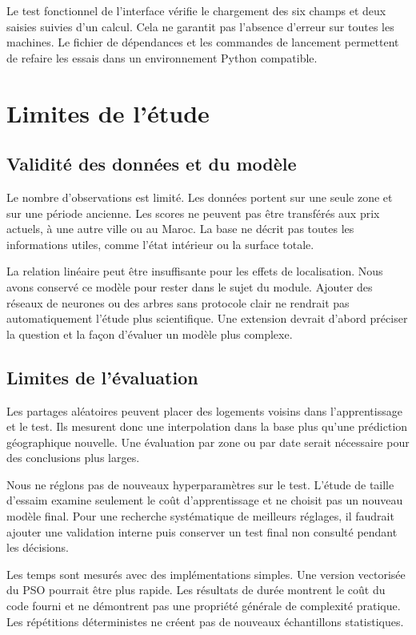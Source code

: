 \documentclass[conference,a4paper]{IEEEtran}
\begin{document}
Le test fonctionnel de l'interface vérifie le chargement des six champs et deux saisies suivies d'un calcul. Cela ne garantit pas l'absence d'erreur sur toutes les machines. Le fichier de dépendances et les commandes de lancement permettent de refaire les essais dans un environnement Python compatible.

\section{Limites de l'étude}
\subsection{Validité des données et du modèle}
Le nombre d'observations est limité. Les données portent sur une seule zone et sur une période ancienne. Les scores ne peuvent pas être transférés aux prix actuels, à une autre ville ou au Maroc. La base ne décrit pas toutes les informations utiles, comme l'état intérieur ou la surface totale.

La relation linéaire peut être insuffisante pour les effets de localisation. Nous avons conservé ce modèle pour rester dans le sujet du module. Ajouter des réseaux de neurones ou des arbres sans protocole clair ne rendrait pas automatiquement l'étude plus scientifique. Une extension devrait d'abord préciser la question et la façon d'évaluer un modèle plus complexe.
\subsection{Limites de l'évaluation}
Les partages aléatoires peuvent placer des logements voisins dans l'apprentissage et le test. Ils mesurent donc une interpolation dans la base plus qu'une prédiction géographique nouvelle. Une évaluation par zone ou par date serait nécessaire pour des conclusions plus larges.

Nous ne réglons pas de nouveaux hyperparamètres sur le test. L'étude de taille d'essaim examine seulement le coût d'apprentissage et ne choisit pas un nouveau modèle final. Pour une recherche systématique de meilleurs réglages, il faudrait ajouter une validation interne puis conserver un test final non consulté pendant les décisions.

Les temps sont mesurés avec des implémentations simples. Une version vectorisée du PSO pourrait être plus rapide. Les résultats de durée montrent le coût du code fourni et ne démontrent pas une propriété générale de complexité pratique. Les répétitions déterministes ne créent pas de nouveaux échantillons statistiques.
\end{document}
